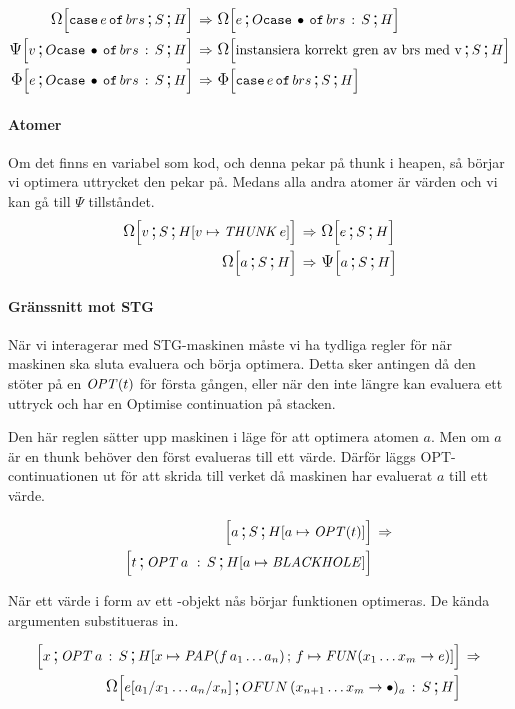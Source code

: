 \documentclass[../Optimise]{subfiles}
\begin{document}
\begin{align}
\label{CBV:CaseOmg} \OMEGA SH{\eCase e{brs}} \rulesep &\, \OMEGA{\oCase{brs}S}He\\
\label{CBV:CasePsi} \PSI{\oCase{brs}S}Hv \rulesep &\, \OMEGA SH{\text{instansiera korrekt gren av brs med v}} \\
\label{CBV:CaseIrr} \IRR{\oCase{brs}S}He \rulesep &\, \IRR SH{\eCase e brs}
\end{align}


\paragraph{Atomer}
Om det finns en variabel som kod, och denna pekar på thunk i heapen, så börjar vi
optimera uttrycket den pekar på. Medans alla andra atomer är värden och vi kan gå
till $\Psi$ tillståndet.
\begin{align}
\OMEGA S{\heap{v}{\THUNK{e}}}v \rulesep &\, \OMEGA SHe \\
\OMEGA SHa \rulesep &\, \PSI SHa
\end{align}


\paragraph{Gränssnitt mot STG}
När vi interagerar med STG-maskinen måste vi ha tydliga regler
för när maskinen ska sluta evaluera och börja optimera. Detta sker
antingen då den stöter på en $\OPT t$ för första gången, eller när den
inte längre kan evaluera ett uttryck och har en Optimise continuation
på stacken.

Den här reglen sätter upp maskinen i läge för att optimera atomen $a$. Men om $a$
är en thunk behöver den först evalueras till ett värde. Därför läggs
OPT-continuationen ut för att skrida till verket då maskinen har evaluerat
$a$ till ett värde.

\begin{align}
\mc aS{\heap a{\OPT t}} & \rulesep\\
\mc t{\cOPT{a\,}S}{\heap a{\BH}} \nonumber
\end{align}

När ett värde i form av ett -objekt nås börjar funktionen optimeras. 
De kända argumenten substitueras in.

\begin{align}
\mc x{\cOPT aS}{\heapp x{\PAP f{a_{1}\ldots a_{n}}}f{\FUN{x_{1}\ldots x_{m}}e}} & \rulesep\\
\OMEGA{\cOFUN{x_{n+1}\ldots x_{m}}aS}H{e[a_{1}/x_{1}\ldots a_{n}/x_{n}]} \nonumber
\end{align}
\end{document}
